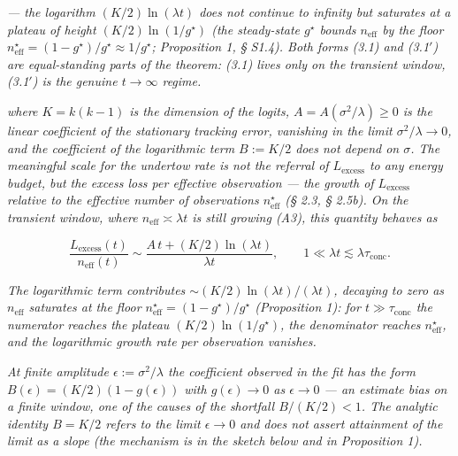 \documentclass[12pt]{iopart}
\begin{document}
\emph{--- the logarithm \((K/2)\ln(\lambda t)\) does \emph{not} continue to infinity but saturates at a plateau of height \((K/2)\ln(1/g^\star)\) (the steady-state \(g^\star\) bounds \(n_{\text{eff}}\) by the floor \(n_{\text{eff}}^\star = (1-g^\star)/g^\star \approx 1/g^\star\); Proposition 1, § S1.4). Both forms (3.1) and (3.1\('\)) are equal-standing parts of the theorem: (3.1) lives only on the transient window, (3.1\('\)) is the genuine \(t\to\infty\) regime.}



\emph{where \(K = k(k-1)\) is the dimension of the logits, \(A = A(\sigma^2/\lambda) \ge 0\) is the linear coefficient of the stationary tracking error, vanishing in the limit \(\sigma^2/\lambda \to 0\), and the coefficient of the logarithmic term \(B := K/2\) does not depend on \(\sigma\). The meaningful scale for the undertow rate is not the referral of \(L_{\text{excess}}\) to any energy budget, but the excess loss per effective observation --- the growth of \(L_{\text{excess}}\) relative to the effective number of observations \(n_{\text{eff}}^\star\) (§ 2.3, § 2.5b). On the transient window, where \(n_{\text{eff}} \asymp \lambda t\) is still growing (A3), this quantity behaves as}



\begin{equation}\frac{L_{\text{excess}}(t)}{n_{\text{eff}}(t)} \sim \frac{A\,t + (K/2)\ln(\lambda t)}{\lambda t}, \qquad 1\ll\lambda t\lesssim\lambda\tau_{\text{conc}}. \tag{3.2}\end{equation}



\emph{The logarithmic term contributes \(\sim (K/2)\ln(\lambda t)/(\lambda t)\), decaying to zero as \(n_{\text{eff}}\) saturates at the floor \(n_{\text{eff}}^\star = (1-g^\star)/g^\star\) (Proposition 1): for \(t\gg\tau_{\text{conc}}\) the numerator reaches the plateau \((K/2)\ln(1/g^\star)\), the denominator reaches \(n_{\text{eff}}^\star\), and the logarithmic growth rate per observation vanishes.}



\emph{At finite amplitude \(\epsilon := \sigma^2/\lambda\) the coefficient observed in the fit has the form \(B(\epsilon) = (K/2)(1 - g(\epsilon))\) with \(g(\epsilon) \to 0\) as \(\epsilon \to 0\) --- an estimate bias on a finite window, one of the causes of the shortfall \(B/(K/2) < 1\). The analytic identity \(B = K/2\) refers to the limit \(\epsilon\to 0\) and does not assert attainment of the limit as a slope (the mechanism is in the sketch below and in Proposition 1).}
\end{document}

